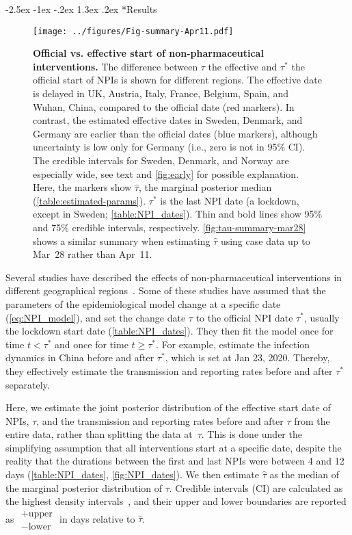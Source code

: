 \documentclass[12pt]{extarticle}
\makeatletter
\renewcommand\section{\@startsection {section}{1}{\z@}%
     {-2.5ex \@plus -1ex \@minus -.2ex}%
     {1.3ex \@plus.2ex}%
    {\Large\bfseries}}
\makeatother
\begin{document}
\section*{Results}


\begin{figure}[b!]
    \centering
	\texttt{[image: ../figures/Fig-summary-Apr11.pdf]}	
    \caption{
    \textbf{Official vs. effective start of non-pharmaceutical interventions.}
    	The difference between $\tau$ the effective and $\tau^*$ the official start of NPIs is shown for different regions. The effective date is delayed in UK, Austria, Italy, France, Belgium, Spain, and Wuhan, China, compared to the official date (red markers). In contrast, the estimated effective dates in Sweden, Denmark, and Germany are earlier than the official dates (blue markers), although uncertainty is low only for Germany (i.e., zero is not in 95\% CI). The credible intervals for Sweden, Denmark, and Norway are especially wide, see text and \autoref{fig:early} for possible explanation.
	Here, the markers show $\hat{\tau}$, the marginal posterior median (\autoref{table:estimated-params}). $\tau^*$ is the last NPI date (a lockdown, except in Sweden; \autoref{table:NPI_dates}). Thin and bold lines show 95\% and 75\% credible intervals, respectively. \autoref{fig:tau-summary-mar28} shows a similar summary when estimating $\hat{\tau}$ using case data up to Mar~28 rather than Apr~11.
    }
    \label{fig:tau-summary}
\end{figure}



Several studies have described the effects of non-pharmaceutical interventions in different geographical regions~\citep{Flaxman2020,Gatto2020,Li2020}. 
Some of these studies have assumed that the parameters of the epidemiological model change at a specific date (\autoref{eq:NPI_model}), and set the change date $\tau$ to the official NPI date $\tau^*$, usually the lockdown start date (\autoref{table:NPI_dates}).
They then fit the model once for time $t<\tau^*$ and once for time $t \ge \tau^*$.
For example, \citet{Li2020} estimate the infection dynamics in China before and after $\tau^*$, which is set at Jan 23, 2020. Thereby, they effectively estimate the transmission and reporting rates before and after $\tau^*$ separately.

Here, we estimate the joint posterior distribution of the effective start date of NPIs, $\tau$, and the transmission and reporting rates before and after $\tau$ from the entire data, rather than splitting the data at~$\tau$. 
This is done under the simplifying assumption that all interventions start at a specific date, despite the reality that the durations between the first and last NPIs were between 4 and 12 days (\autoref{table:NPI_dates}, \autoref{fig:NPI_dates}).
We then estimate $\hat{\tau}$ as the median of the marginal posterior distribution of $\tau$.
Credible intervals (CI) are calculated as the highest density intervals~\citep{Kruschke2014}, and their upper and lower boundaries are reported as $\substack{+\text{upper} \\ -\text{lower}}$ in days relative to $\hat{\tau}$.
\end{document}
